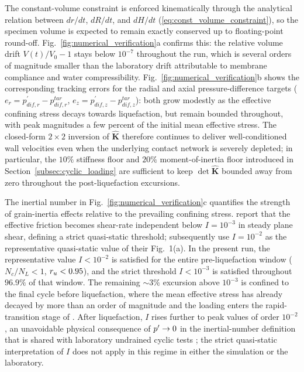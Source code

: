 The constant-volume constraint is enforced kinematically through the analytical relation between $dr/dt$, $dR/dt$, and $dH/dt$ (\cref{eq:const_volume_constraint}), so the specimen volume is expected to remain exactly conserved up to floating-point round-off. Fig.~\ref{fig:numerical_verification}a confirms this: the relative volume drift $V(t)/V_0 - 1$ stays below $10^{-7}$ throughout the run, which is several orders of magnitude smaller than the laboratory drift attributable to membrane compliance and water compressibility. Fig.~\ref{fig:numerical_verification}b shows the corresponding tracking errors for the radial and axial pressure-difference targets ($e_r = p_{dif,r}^{\prime} - p_{dif,r}^{tar}$, $e_z = p_{dif,z}^{\prime} - p_{dif,z}^{tar}$): both grow modestly as the effective confining stress decays towards liquefaction, but remain bounded throughout, with peak magnitudes a few percent of the initial mean effective stress. The closed-form $2 \times 2$ inversion of $\hat{\mathbf{K}}$ therefore continues to deliver well-conditioned wall velocities even when the underlying contact network is severely depleted; in particular, the $10\%$ stiffness floor and $20\%$ moment-of-inertia floor introduced in Section~\ref{subsec:cyclic_loading} are sufficient to keep $\det\hat{\mathbf{K}}$ bounded away from zero throughout the post-liquefaction excursions.

The inertial number in Fig.~\ref{fig:numerical_verification}c quantifies the strength of grain-inertia effects relative to the prevailing confining stress. \citet{GDRMiDi2004} report that the effective friction becomes shear-rate independent below $I = 10^{-3}$ in steady plane shear, defining a strict quasi-static threshold; \citet{daCruzEmam2005} subsequently use $I = 10^{-2}$ as the representative quasi-static value of their Fig.~1(a). In the present run, the representative value $I < 10^{-2}$ is satisfied for the entire pre-liquefaction window ($N_c/N_L < 1$, $r_u < 0.95$), and the strict threshold $I < 10^{-3}$ is satisfied throughout $96.9\%$ of that window. The remaining $\sim 3\%$ excursion above $10^{-3}$ is confined to the final cycle before liquefaction, where the mean effective stress has already decayed by more than an order of magnitude and the loading enters the rapid-transition stage of \citet{Wang2025inertial}. After liquefaction, $I$ rises further to peak values of order $10^{-2}$, an unavoidable physical consequence of $p^\prime \to 0$ in the inertial-number definition that is shared with laboratory undrained cyclic tests \citep{Wang2025inertial}; the strict quasi-static interpretation of $I$ does not apply in this regime in either the simulation or the laboratory.

